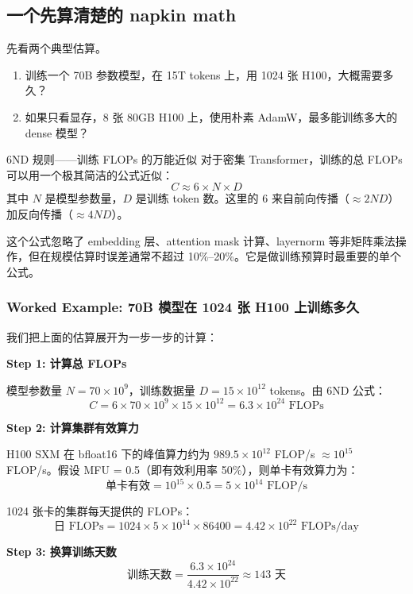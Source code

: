 \subsection{一个先算清楚的 napkin math}

先看两个典型估算。

\begin{enumerate}
    \item 训练一个 70B 参数模型，在 15T tokens 上，用 1024 张 H100，大概需要多久？
    \item 如果只看显存，8 张 80GB H100 上，使用朴素 AdamW，最多能训练多大的 dense 模型？
\end{enumerate}

\begin{importantbox}{6ND 规则——训练 FLOPs 的万能近似}
对于密集 Transformer，训练的总 FLOPs 可以用一个极其简洁的公式近似：
$$
C \approx 6 \times N \times D
$$
其中 $N$ 是模型参数量，$D$ 是训练 token 数。这里的 6 来自前向传播（$\approx 2ND$）加反向传播（$\approx 4ND$）。

这个公式忽略了 embedding 层、attention mask 计算、layernorm 等非矩阵乘法操作，但在规模估算时误差通常不超过 10\%--20\%。它是做训练预算时最重要的单个公式。
\end{importantbox}

\subsubsection{Worked Example: 70B 模型在 1024 张 H100 上训练多久}

我们把上面的估算展开为一步一步的计算：

\textbf{Step 1: 计算总 FLOPs}

模型参数量 $N = 70 \times 10^9$，训练数据量 $D = 15 \times 10^{12}$ tokens。由 6ND 公式：
$$
C = 6 \times 70 \times 10^9 \times 15 \times 10^{12} = 6.3 \times 10^{24} \text{ FLOPs}
$$

\textbf{Step 2: 计算集群有效算力}

H100 SXM 在 bfloat16 下的峰值算力约为 $989.5 \times 10^{12}$ FLOP/s $\approx 10^{15}$ FLOP/s。假设 MFU = 0.5（即有效利用率 50\%），则单卡有效算力为：
$$
\text{单卡有效} = 10^{15} \times 0.5 = 5 \times 10^{14} \text{ FLOP/s}
$$

1024 张卡的集群每天提供的 FLOPs：
$$
\text{日 FLOPs} = 1024 \times 5 \times 10^{14} \times 86400 = 4.42 \times 10^{22} \text{ FLOPs/day}
$$

\textbf{Step 3: 换算训练天数}
$$
\text{训练天数} = \frac{6.3 \times 10^{24}}{4.42 \times 10^{22}} \approx 143 \text{ 天}
$$

